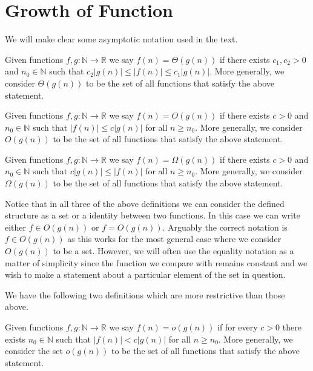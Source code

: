 \section{Growth of Function}
\label{sec:chapter3}

We will make clear some asymptotic notation used in the text.
\begin{definition}
	\label{def:big-theta}
	Given functions $f,g:\mathbb{N}\to\mathbb{R}$ we say $f(n) = \Theta(g(n))$ if there exists $c_{1},c_{2}>0$ and $n_{0}\in\mathbb{N}$ such that $c_{2}\left|g(n)\right|\leq \left|f(n)\right|\leq c_{1}\left|g(n)\right|$. More generally, we consider $\Theta(g(n))$ to be the set of all functions that satisfy the above statement.
\end{definition}

\begin{definition}
	\label{def:big-O}
	Given functions $f,g:\mathbb{N}\to\mathbb{R}$ we say $f(n)=O(g(n))$ if there exists $c>0$ and $n_{0}\in\mathbb{N}$ such that $\left|f(n)\right|\leq c\left|g(n)\right|$ for all $n\geq n_{0}$. More generally, we consider $O(g(n))$ to be the set of all functions that satisfy the above statement.
\end{definition}

\begin{definition}
	\label{def:big-omega}
	Given functions $f,g:\mathbb{N}\to\mathbb{R}$ we say $f(n)=\Omega(g(n))$ if there exists $c>0$ and $n_{0}\in\mathbb{N}$ such that $c\left|g(n)\right|\leq\left|f(n)\right|$ for all $n\geq n_{0}$. More generally, we consider $\Omega(g(n))$ to be the set of all functions that satisfy the above statement.
\end{definition}

Notice that in all three of the above definitions we can consider the defined structure as a set or a identity between two functions. In this case we can write either $f\in O(g(n))$ or $f=O(g(n))$. Arguably the correct notation is $f\in O(g(n))$ as this works for the most general case where we consider $O(g(n))$ to be a set. However, we will often use the equality notation as a matter of simplicity since the function we compare with remains constant and we wish to make a statement about a particular element of the set in question.

We have the following two definitions which are more restrictive than those above.
\begin{definition}
	\label{def:little-oh}
	Given functions $f,g:\mathbb{N}\to\mathbb{R}$ we say $f(n)=o(g(n))$ if for every $c>0$ there exists $n_{0}\in\mathbb{N}$ such that $\left|f(n)\right|<c \left|g(n)\right|$ for all $n\geq n_{0}$. More generally, we consider the set $o(g(n))$ to be the set of all functions that satisfy the above statement.
\end{definition}

